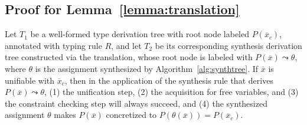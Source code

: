 \documentclass[manuscript,screen]{acmart}
\begin{document}
\subsection{Proof for Lemma~\ref{lemma:translation}}
\label{sec:appendix-lemma3}
\begin{lemma}
Let $T_1$ be a well-formed type derivation tree with root node labeled $P(\overline{x}_c)$, annotated with typing rule $R$, and let $T_2$ be its corresponding synthesis derivation tree constructed via the translation, whose root node is labeled with $P(\overline{x}) \leadsto \theta$, where $\theta$ is the assignment synthesized by Algorithm~\ref{alg:synthtree}.
If $\overline{x}$ is unifiable with $\overline{x}_c$, then in the application of the synthesis rule that derives $P(\overline{x}) \leadsto \theta$, (1) the unification step, (2) the acquisition for free variables, and (3) the constraint checking step will always succeed, and (4) the synthesized assignment $\theta$ makes $P(\overline{x})$ concretized to $P(\theta(\overline{x})) = P(\overline{x}_c)$.
\end{lemma}
\end{document}
